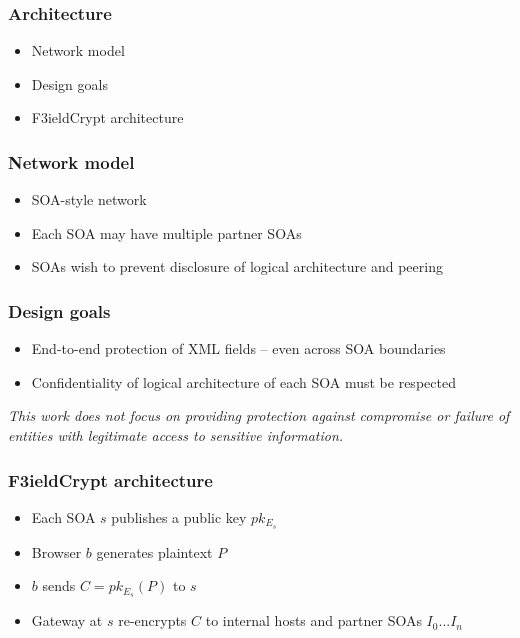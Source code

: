 \documentclass{beamer}
\begin{document}
\begin{frame}
\frametitle{Architecture}
\begin{itemize}
\item Network model
\item Design goals
\item F3ieldCrypt architecture
\end{itemize}
\end{frame}

\begin{frame}
\frametitle{Network model}
\begin{itemize}
\item SOA-style network
\item Each SOA may have multiple partner SOAs
\item SOAs wish to prevent disclosure of logical architecture and peering 
\end{itemize}
\end{frame}


\begin{frame}
\frametitle{Design goals}
\begin{itemize}
\item End-to-end protection of XML fields -- even across SOA boundaries
\item Confidentiality of logical architecture of each SOA must be respected
\end{itemize}
\medskip
\small{\emph{This work does not focus on providing protection against
compromise or failure of entities with legitimate access to sensitive
information.}}
\end{frame}

\begin{frame}
\frametitle{F3ieldCrypt architecture}
\begin{itemize}
\item Each SOA $s$ publishes a public key $pk_{E_s}$
\item Browser $b$ generates plaintext $P$
\item $b$ sends $C = pk_{E_s}(P)$ to $s$
\item Gateway at $s$ re-encrypts $C$ to internal hosts and partner SOAs
$I_0...I_n$ 
\end{itemize}
\end{frame}
\end{document}

